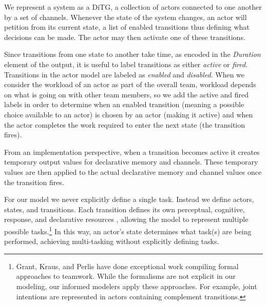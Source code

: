 %



We represent a system as a DiTG, a collection of
actors connected to one another by a set of channels.  Whenever the state of the
system changes, an actor will petition from its current state, a list of enabled
transitions thus defining what decisions can be made.  The actor may then
activate one of these transitions.  

Since transitions from one state to another take time, as encoded in the {\em Duration} element of the output, it is useful to label transitions as either {\em active} or {\em fired}. Transitions in the actor model are labeled as {\em enabled} and {\em disabled}. When we consider the workload of an actor as part of the overall team, workload depends on what is going on with other team members, so we add the active and fired labels in order to determine when an enabled transition (meaning a possible choice available to an actor) is chosen by an actor (making it active) and when the actor completes the work required to enter the next state (the transition fires).  

From an implementation perspective, when a transition becomes active it creates temporary
output values for declarative memory and channels.  These temporary values are
then applied to the actual declarative memory and channel values once the transition fires.

For our model we never explicitly define a single task.  Instead
we define actors, states, and transitions.  Each transition defines its own
perceptual, cognitive, response, and declarative resources \cite{salvucci2008threaded}, allowing the model to represent multiple possible tasks.\footnote{Grant, Kraus, and Perlis have done exceptional work compiling formal approaches
to teamwork. While the formalisms are not explicit in our modeling, our informed
modelers apply these approaches. For example, joint intentions are represented
in actors containing complement transitions.}  In this way, an actor's state
determines what task(s) are being performed, achieving multi-tasking without
explicitly defining tasks. 

